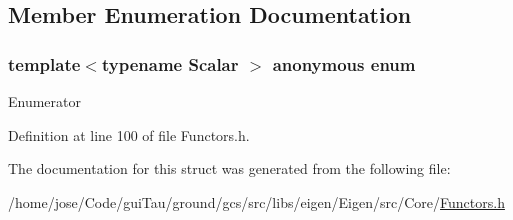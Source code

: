 \subsection{Member Enumeration Documentation}
\hypertarget{structei__functor__traits_3_01ei__scalar__max__op_3_01_scalar_01_4_01_4_a70dbc2810c91a84c72d89289e14807f7}{\subsubsection[{anonymous enum}]{\setlength{\rightskip}{0pt plus 5cm}template$<$typename Scalar $>$ anonymous enum}}\label{structei__functor__traits_3_01ei__scalar__max__op_3_01_scalar_01_4_01_4_a70dbc2810c91a84c72d89289e14807f7}
\begin{Desc}
\item[Enumerator]\par
\begin{description}
\item[{\em 
\hypertarget{structei__functor__traits_3_01ei__scalar__max__op_3_01_scalar_01_4_01_4_a70dbc2810c91a84c72d89289e14807f7a923610c19dcab0e4b35010a7603797f9}{Cost}\label{structei__functor__traits_3_01ei__scalar__max__op_3_01_scalar_01_4_01_4_a70dbc2810c91a84c72d89289e14807f7a923610c19dcab0e4b35010a7603797f9}
}]\end{description}
\end{Desc}


Definition at line 100 of file Functors.\-h.



The documentation for this struct was generated from the following file\-:\begin{DoxyCompactItemize}
\item 
/home/jose/\-Code/gui\-Tau/ground/gcs/src/libs/eigen/\-Eigen/src/\-Core/\hyperlink{_core_2_functors_8h}{Functors.\-h}\end{DoxyCompactItemize}
